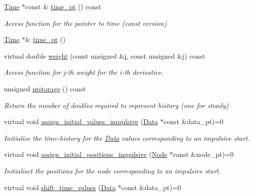 \begin{DoxyCompactItemize}
\hyperlink{classoomph_1_1Time}{Time} $\ast$const  \& \hyperlink{classoomph_1_1TimeStepper_af85e8103c08de76d5a9399d30fc2211c}{time\+\_\+pt} () const
\begin{DoxyCompactList}\small\item\em Access function for the pointer to time (const version) \end{DoxyCompactList}\item 
\hyperlink{classoomph_1_1Time}{Time} $\ast$\& \hyperlink{classoomph_1_1TimeStepper_a3219b7e7ccdc37f733961eeb8cce0a49}{time\+\_\+pt} ()
\item 
virtual double \hyperlink{classoomph_1_1TimeStepper_a4cb0aecb044b77ba0553cdd54b586d8a}{weight} (const unsigned \&\hyperlink{cfortran_8h_adb50e893b86b3e55e751a42eab3cba82}{i}, const unsigned \&j) const
\begin{DoxyCompactList}\small\item\em Access function for j-\/th weight for the i-\/th derivative. \end{DoxyCompactList}\item 
unsigned \hyperlink{classoomph_1_1TimeStepper_a3939b77ec3578e4bd5b453c85649d631}{ntstorage} () const
\begin{DoxyCompactList}\small\item\em Return the number of doubles required to represent history (one for steady) \end{DoxyCompactList}\item 
virtual void \hyperlink{classoomph_1_1TimeStepper_a7e894df13c88c96dd8eced2700228225}{assign\+\_\+initial\+\_\+values\+\_\+impulsive} (\hyperlink{classoomph_1_1Data}{Data} $\ast$const \&data\+\_\+pt)=0
\begin{DoxyCompactList}\small\item\em Initialise the time-\/history for the \hyperlink{classoomph_1_1Data}{Data} values corresponding to an impulsive start. \end{DoxyCompactList}\item 
virtual void \hyperlink{classoomph_1_1TimeStepper_ab66972f0eaf3ba34645793e23e46afd5}{assign\+\_\+initial\+\_\+positions\+\_\+impulsive} (\hyperlink{classoomph_1_1Node}{Node} $\ast$const \&node\+\_\+pt)=0
\begin{DoxyCompactList}\small\item\em Initialiset the positions for the node corresponding to an impulsive start. \end{DoxyCompactList}\item 
virtual void \hyperlink{classoomph_1_1TimeStepper_a010a3b03a23a1c48dd8ca10641427255}{shift\+\_\+time\+\_\+values} (\hyperlink{classoomph_1_1Data}{Data} $\ast$const \&data\+\_\+pt)=0

\end{DoxyCompactItemize}

